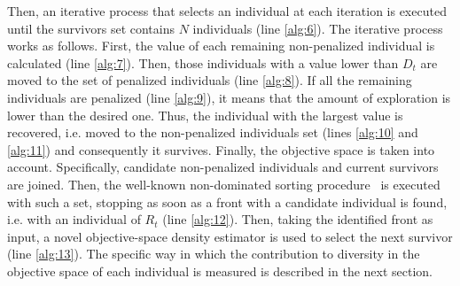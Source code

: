 Then, an iterative process that selects an individual at each iteration is executed until the survivors
set contains $N$ individuals (line \ref{alg:6}).
%
The iterative process works as follows.
%
First, the \DCS{} value of each remaining non-penalized individual is calculated (line \ref{alg:7}).
%
Then, those individuals with a \DCS{} value lower than $D_t$ are moved to the set of penalized individuals (line \ref{alg:8}).
%
If all the remaining individuals are penalized (line \ref{alg:9}), it means that the amount of exploration is lower than the
desired one.
%
Thus, the individual with the largest \DCS{} value is recovered, i.e. moved to the non-penalized individuals 
set (lines \ref{alg:10} and \ref{alg:11}) and consequently it survives.
%
Finally, the objective space is taken into account.
%
Specifically, candidate non-penalized individuals and current survivors are joined.
%
Then, the well-known non-dominated sorting procedure~\cite{Joel:NSGAII} is executed with such a set, stopping as soon as a front with 
a candidate individual is found, i.e. with an individual of $R_t$ (line \ref{alg:12}).
%
Then, taking the identified front as input, a novel objective-space density estimator is used to select
the next survivor (line \ref{alg:13}).
%
The specific way in which the contribution to diversity in the objective space of each individual is measured is described in the next section.
%

%


%
%
%

%
%
%

